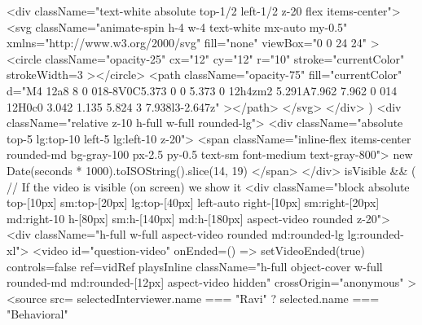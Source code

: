 {{{{{                      <div className="text-white absolute top-1/2 left-1/2 z-20 flex items-center">
                        <svg
                          className="animate-spin h-4 w-4 text-white mx-auto my-0.5"
                          xmlns="http://www.w3.org/2000/svg"
                          fill="none"
                          viewBox="0 0 24 24"
                        >
                          <circle
                            className="opacity-25"
                            cx="12"
                            cy="12"
                            r="10"
                            stroke="currentColor"
                            strokeWidth={3}
                          ></circle>
                          <path
                            className="opacity-75"
                            fill="currentColor"
                            d="M4 12a8 8 0 018-8V0C5.373 0 0 5.373 0 12h4zm2 5.291A7.962 7.962 0 014 12H0c0 3.042 1.135 5.824 3 7.938l3-2.647z"
                          ></path>
                        </svg>
                      </div>
                    )}
                    <div className="relative z-10 h-full w-full rounded-lg">
                      <div className="absolute top-5 lg:top-10 left-5 lg:left-10 z-20">
                        <span className="inline-flex items-center rounded-md bg-gray-100 px-2.5 py-0.5 text-sm font-medium text-gray-800">
                          {new Date(seconds * 1000).toISOString().slice(14, 19)}
                        </span>
                      </div>
                      {isVisible && ( // If the video is visible (on screen) we show it
                        <div className="block absolute top-[10px] sm:top-[20px] lg:top-[40px] left-auto right-[10px] sm:right-[20px] md:right-10 h-[80px] sm:h-[140px] md:h-[180px] aspect-video rounded z-20">
                          <div className="h-full w-full aspect-video rounded md:rounded-lg lg:rounded-xl">
                            <video
                              id="question-video"
                              onEnded={() => setVideoEnded(true)}
                              controls={false}
                              ref={vidRef}
                              playsInline
                              className="h-full object-cover w-full rounded-md md:rounded-[12px] aspect-video hidden"
                              crossOrigin="anonymous"
                            >
                              <source
                                src={
                                  selectedInterviewer.name === "Ravi"
                                    ? selected.name === "Behavioral"
}}}}}}
